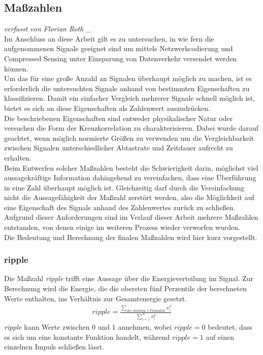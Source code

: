 \subsection{Maßzahlen}
\small\textit{verfasst von Florian Roth}
\normalsize_{}
\\ Im Anschluss an diese Arbeit gilt es zu untersuchen, in wie fern die aufgenommenen Signale geeignet sind um mittels Netzwerkcodierung und Compressed Sensing unter Einsparung von Datenverkehr versendet werden können. 
\\ Um das für eine große Anzahl an Signalen überhaupt möglich zu machen, ist es erforderlich die untersuchten Signale anhand von  bestimmten Eigenschaften zu klassifizieren. Damit ein einfacher Vergleich mehrerer Signale schnell möglich ist, bietet es sich an diese Eigenschaften als Zahlenwert auszudrücken. 
\\ Die beschriebenen Eigenschaften sind entweder physikalischer Natur oder versuchen die Form der Kreuzkorrelation zu charakterisieren. Dabei wurde darauf geachtet, wenn möglich normierte Größen zu verwenden um die Vergleichbarkeit zwischen Signalen unterschiedlicher Abtastrate und Zeitdauer aufrecht zu erhalten. 
\\ Beim Entwerfen solcher Maßzahlen besteht die Schwierigkeit darin, möglichst viel aussagekräftige Information dahingehend zu vereinfachen, dass eine Überführung in eine Zahl überhaupt möglich ist. Gleichzeitig darf durch die Vereinfachung nicht die Aussagefähigkeit der Maßzahl zerstört werden, also die Möglichkeit auf eine Eigenschaft des Signals anhand des Zahlenwertes zurück zu schließen. Aufgrund dieser Anforderungen sind im Verlauf dieser Arbeit mehrere Maßzahlen entstanden, von denen einige im weiteren Prozess wieder verworfen wurden. 
\\Die Bedeutung und Berechnung der finalen Maßzahlen wird hier kurz vorgestellt. 
\subsubsection{ripple}
Die Maßzahl \textit{ripple} trifft eine Aussage über die Energieverteilung im Signal. Zur Berechnung wird die Energie, die die obersten fünf Perzentile der berechneten Werte enthalten, ins Verhältnis zur Gesamtenergie gesetzt. 
\begin{align*}
ripple = \frac{\sum_{\text{der obersten 5 Perzentile}}x_{i}^2}{\sum_{i=1}^{N}x_{i}^2}
\end{align*}
\textit{ripple} kann Werte zwischen 0 und 1 annehmen, wobei $ripple = 0$ bedeutet, dass es sich um eine konstante Funktion handelt, während $ripple = 1$ auf einen einzelnen Impuls schließen lässt.
